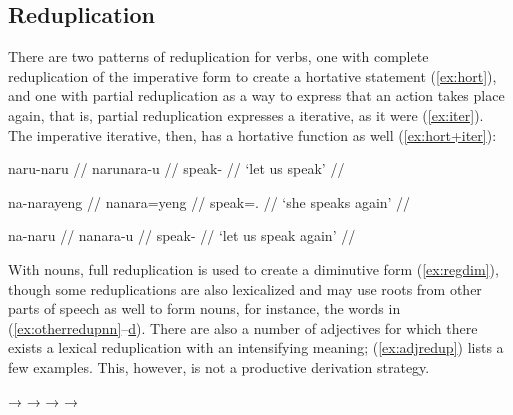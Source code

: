\xe


\subsection{Reduplication}
\label{subsec:reduplication}

There are two patterns of reduplication for verbs, one with complete
reduplication of the imperative form to create a hortative statement
(\ref{ex:hort}), and one with partial reduplication as a way to express that an
action takes place again, that is, partial reduplication expresses a iterative,
as it were (\ref{ex:iter}). The imperative iterative, then, has a hortative
function as well (\ref{ex:hort+iter}):

\pex
\a\label{ex:hort}\begingl%
	\gla naru-naru //
	\glb naru\til{}nara-u //
	\glc \Hort{}\til{}speak-\Imp{} //
	\glft `let us speak' //
\endgl

\a\label{ex:iter}\begingl
	\gla na-narayeng //
	\glb na\til{}nara=yeng //
	\glc \Iter{}\til{}speak=\TsgF{}.\Aarg{} //
	\glft `she speaks again' //
\endgl

\a\label{ex:hort+iter}\begingl
	\gla na-naru //
	\glb na\til{}nara-u //
	\glc \Iter{}\til{}speak-\Imp{} //
	\glft `let us speak again' //
\endgl

\xe

With nouns, full reduplication is used to create a diminutive
form (\ref{ex:regdim}), though some reduplications are also lexicalized and may
use roots from other parts of speech as well to form nouns, for instance, the
words in (\ref{ex:otherredupnn}--\hyperref[ex:otherredupvb]{d}). There are also
a number of adjectives for which there exists a lexical reduplication with an
intensifying meaning; (\ref{ex:adjredup}) lists a few examples. This, however,
is not a productive derivation strategy.

\pex
	\a {}
		→ \label{ex:regdim}
	\a {}
		→ %
			\label{ex:otherredupnn}
	\a {}
		→  
			\label{ex:otherredupadj}
	\a {} → 
			\label{ex:otherredupvb}
\xe

